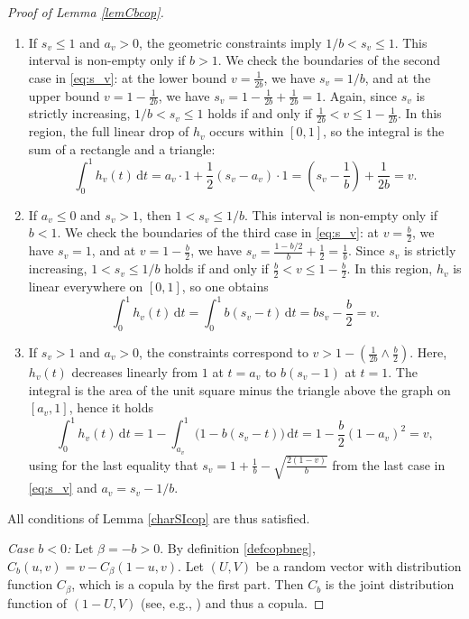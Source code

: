 \documentclass{article}
\theoremstyle{plain}
\theoremstyle{definition}
\newcommand{\de}{\mathrm{\,d}}
\begin{document}
\begin{proof}[Proof of Lemma \ref{lemCbcop}]
\begin{enumerate}[label=(\roman*), font=\upshape]
\begin{enumerate}[label=\arabic*., font=\upshape]
        \[
            \int_0^1 h_v(t)\de t = \int_0^{s_v} b(s_v-t) \de t = \frac{b}{2}s_v^2 = \frac{b}{2}\left(\frac{2v}{b}\right) = v.
        \]
        \item If \(s_v \le 1\) and \( a_v > 0\), the geometric constraints imply \(1/b < s_v \le 1\). This interval is non-empty only if \(b > 1\).
        We check the boundaries of the second case in \eqref{eq:s_v}: at the lower bound \(v = \frac{1}{2b}\), we have \(s_v = 1/b\), and at the upper bound \(v = 1 - \frac{1}{2b}\), we have \(s_v = 1 - \frac{1}{2b} + \frac{1}{2b} = 1\).
        Again, since \(s_v\) is strictly increasing, \(1/b < s_v \le 1\) holds if and only if \(\frac{1}{2b} < v \le 1 - \frac{1}{2b}\).
        In this region, the full linear drop of \(h_v\) occurs within \([0,1]\), so the integral is the sum of a rectangle and a triangle:
        \[
            \int_0^1 h_v(t)\de t = a_v \cdot 1 + \frac{1}{2}(s_v-a_v)\cdot 1 = \left(s_v - \frac{1}{b}\right) + \frac{1}{2b}= v.
        \]
        \item If \(a_v \le 0\) and \(s_v > 1\), then \(1 < s_v \le 1/b\). This interval is non-empty only if \(b < 1\).
        We check the boundaries of the third case in \eqref{eq:s_v}: at \(v = \frac{b}{2}\), we have \(s_v = 1\), and at \(v = 1 - \frac{b}{2}\), we have \(s_v = \frac{1-b/2}{b} + \frac{1}{2} = \frac{1}{b}\).
        Since \(s_v\) is strictly increasing, \(1 < s_v \le 1/b\) holds if and only if \(\frac{b}{2} < v \le 1 - \frac{b}{2}\).
        In this region, \(h_v\) is linear everywhere on \([0,1]\), so one obtains
        \[
            \int_0^1 h_v(t)\de t = \int_0^1 b(s_v-t) \de t = b s_v - \frac{b}{2} = v.
        \]
        \item If \(s_v > 1\) and \(a_v > 0\), the constraints correspond to \(v > 1 - (\frac{1}{2b} \wedge \frac{b}{2})\).
        Here, \(h_v(t)\) decreases linearly from \(1\) at \(t=a_v\) to \(b(s_v-1)\) at \(t=1\). The integral is the area of the unit square minus the triangle above the graph on \([a_v, 1]\), hence it holds
        \[
            \int_0^1 h_v(t)\de t = 1 - \int_{a_v}^1 \bigl(1-b(s_v-t)\bigr) \de t = 1 - \frac{b}{2}(1-a_v)^2 = v,
        \]
        using for the last equality that \(s_v = 1 + \frac{1}{b} - \sqrt{\frac{2(1-v)}{b}}\) from the last case in \eqref{eq:s_v} and \(a_v = s_v - 1/b\).
    \end{enumerate}
\end{enumerate}
All conditions of Lemma \ref{charSIcop} are thus satisfied.

\emph{Case \(b<0\):}
Let \(\beta = -b > 0\). By definition \eqref{defcopbneg}, \(C_b(u,v) = v - C_{\beta}(1-u, v)\).
Let \((U,V)\) be a random vector with distribution function \(C_\beta\), which is a copula by the first part. Then \(C_b\) is the joint distribution function of \((1-U, V)\) (see, e.g., \cite[Corollary~2.4.4 (c)]{Durante-2016}) and thus a copula.
\end{proof}
\end{document}

